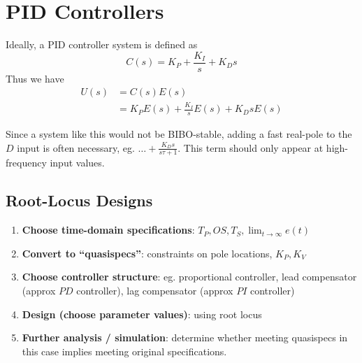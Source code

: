 \documentclass[12pt]{article}
\begin{document}
\section{PID Controllers}
Ideally, a PID controller system is defined as \[ C(s) = K_P + \frac{K_I}{s} + K_Ds \] Thus we have
\begin{align*}
U(s) &= C(s)E(s) \\
&= K_PE(s) + \frac{K_I}{s}E(s) + K_DsE(s)
\end{align*}

Since a system like this would not be BIBO-stable, adding a fast real-pole to the $D$ input is often necessary, eg. $\dots + \frac{K_Ds}{s\tau + 1}$. This term should only appear at high-frequency input values.

\subsection{Root-Locus Designs}
\begin{enumerate}
\item {\bf Choose time-domain specifications}: $T_P, OS, T_S, \lim_{t\to\infty} e(t)$
\item {\bf Convert to ``quasispecs''}: constraints on pole locations, $K_P, K_V$
\item {\bf Choose controller structure}: eg. proportional controller, lead compensator (approx $PD$ controller), lag compensator (approx $PI$ controller)
\item {\bf Design (choose parameter values)}: using root locus
\item {\bf Further analysis / simulation}: determine whether meeting quasispecs in this case implies meeting original specifications.
\end{enumerate}
\end{document}
